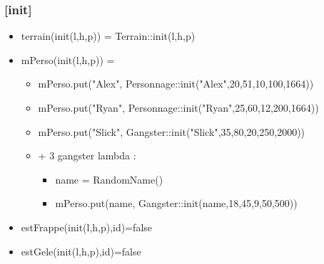 \documentclass[11pt]{article}
\begin{document}
\subsubsection{[init]}
\label{sec-1.7.2}

\begin{itemize}

\item terrain(init(l,h,p)) = Terrain::init(l,h,p)\\
\label{sec-1.7.2.1}



\item mPerso(init(l,h,p)) =\\
\label{sec-1.7.2.2}

\begin{itemize}

\item mPerso.put("Alex", Personnage::init("Alex",20,51,10,100,1664))\\
\label{sec-1.7.2.2.1}


\item mPerso.put("Ryan", Personnage::init("Ryan",25,60,12,200,1664))\\
\label{sec-1.7.2.2.2}


\item mPerso.put("Slick", Gangster::init("Slick",35,80,20,250,2000))\\
\label{sec-1.7.2.2.3}


\item + 3 gangster lambda :\\
\label{sec-1.7.2.2.4}

\begin{itemize}

\item name = RandomName()\\
\label{sec-1.7.2.2.4.1}


\item mPerso.put(name, Gangster::init(name,18,45,9,50,500))\\
\label{sec-1.7.2.2.4.2}


\end{itemize} %
\end{itemize} %

\item estFrappe(init(l,h,p),id)=false\\
\label{sec-1.7.2.3}



\item estGele(init(l,h,p),id)=false\\
\label{sec-1.7.2.4}




\end{itemize}
\end{document}
